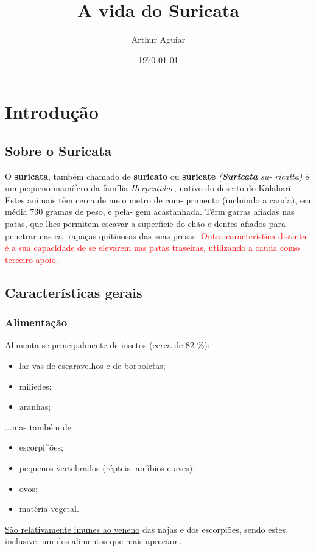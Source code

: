 \documentclass[a4paper,11pt]{report}
\title{A vida do Suricata}
\author{Arthur Aguiar}
\date {\today}
\begin{document}
\maketitle

\chapter{Introdução}

\section{Sobre o Suricata}
O \textbf{suricata}, também chamado de  \textbf{suricato} ou  \textbf{suricate} \textit{(\textbf{Suricata} su-
ricatta)} é um pequeno mamífero da família \textit{Herpestidae}, nativo do
deserto do Kalahari. Estes animais têm cerca de meio metro de com-
primento (incluindo a cauda), em média 730 gramas de peso, e pela-
gem acastanhada. Têrm garras afiadas nas patas, que lhes permitem
escavar a superfície do chão e dentes afiados para penetrar nas ca-
rapaças quitinosas das suas presas. \textcolor{red}{Outra característica distinta é a sua capacidade de se elevarem nas patas traseiras, utilizando a cauda como terceiro apoio.}

\section{Características gerais}
\subsection{Alimentação}
Alimenta-se principalmente de insetos (cerca de 82 \%):
\begin{itemize}
\item lar-vas de escaravelhos e de borboletas;
\item milíedes;
\item aranhas;
\end{itemize}
...mas também de
\begin{itemize}
\item escorpi˜ões;
\item pequenos vertebrados (répteis, anfíbios e aves);
\item ovos;
\item matéria vegetal.
\end{itemize}

\uline{São relativamente imunes ao veneno} das najas
e dos escorpiões, sendo estes, inclusive, um dos alimentos que mais
apreciam.
\end{document}
